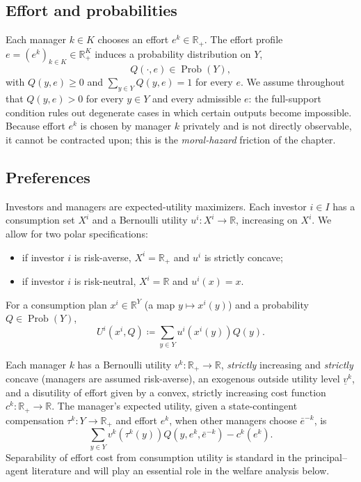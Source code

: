 \documentclass[11pt,a4paper,oneside]{book}
\def\R{\mathbb{R}}
\def\geq{\geqslant}
\DeclareMathOperator{\Prob}{Prob}
\theoremstyle{plain}
\theoremstyle{definition}
\theoremstyle{remark}
\numberwithin{equation}{chapter}
\begin{document}
\subsection{Effort and probabilities}

Each manager $k \in K$ chooses an effort $e^k \in \R_+$.
The effort profile $e = (e^k)_{k \in K} \in \R_+^K$ induces a probability distribution on $Y$,
\begin{equation}\label{eq:MQ08-prob}
  Q(\cdot, e) \in \Prob(Y),
\end{equation}
with $Q(y, e) \geq 0$ and $\sum_{y \in Y} Q(y, e) = 1$ for every $e$.
We assume throughout that $Q(y, e) > 0$ for every $y \in Y$ and every admissible $e$: the full-support condition rules out degenerate cases in which certain outputs become impossible.
Because effort $e^k$ is chosen by manager $k$ privately and is not directly observable, it cannot be contracted upon; this is the \emph{moral-hazard} friction of the chapter.

\subsection{Preferences}

Investors and managers are expected-utility maximizers.
Each investor $i \in I$ has a consumption set $X^i$ and a Bernoulli utility $u^i : X^i \to \R$, increasing on $X^i$.
We allow for two polar specifications:
\begin{itemize}
  \item if investor $i$ is risk-averse, $X^i = \R_+$ and $u^i$ is strictly concave;
  \item if investor $i$ is risk-neutral, $X^i = \R$ and $u^i(x) = x$.
\end{itemize}
For a consumption plan $x^i \in \R^Y$ (a map $y \mapsto x^i(y)$) and a probability $Q \in \Prob(Y)$,
\begin{equation*}
  U^i(x^i, Q) \coloneqq \sum_{y \in Y} u^i(x^i(y)) Q(y).
\end{equation*}

Each manager $k$ has a Bernoulli utility $v^k : \R_+ \to \R$, \emph{strictly} increasing and \emph{strictly} concave (managers are assumed risk-averse), an exogenous outside utility level $\underline{v}^k$, and a disutility of effort given by a convex, strictly increasing cost function $c^k : \R_+ \to \R$.
The manager's expected utility, given a state-contingent compensation $\tau^k : Y \to \R_+$ and effort $e^k$, when other managers choose $\bar{e}^{-k}$, is
\begin{equation}\label{eq:manager-utility-MQ08}
  \sum_{y \in Y} v^k(\tau^k(y)) Q(y, e^k, \bar{e}^{-k}) - c^k(e^k).
\end{equation}
Separability of effort cost from consumption utility is standard in the principal--agent literature and will play an essential role in the welfare analysis below.
\end{document}
